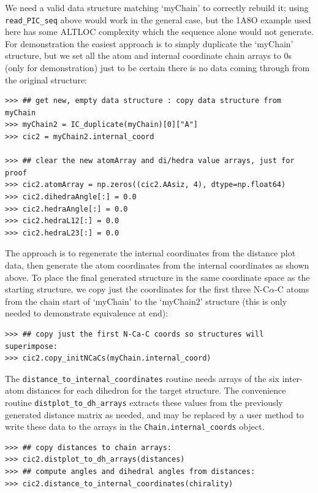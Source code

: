 We need a valid data structure matching `myChain' to correctly rebuild it; using
\texttt{read\_PIC\_seq\(\)} above would work in the general case, but the 1A8O example
used here has some ALTLOC complexity which the sequence alone would not generate.
For demonstration the easiest approach is to simply duplicate the `myChain'
structure, but we set all the atom and internal coordinate chain arrays to 0s
(only for demonstration) just to be certain there is no data coming through from the
original structure:

\begin{verbatim}
>>> ## get new, empty data structure : copy data structure from myChain
>>> myChain2 = IC_duplicate(myChain)[0]["A"]
>>> cic2 = myChain2.internal_coord

>>> ## clear the new atomArray and di/hedra value arrays, just for proof
>>> cic2.atomArray = np.zeros((cic2.AAsiz, 4), dtype=np.float64)
>>> cic2.dihedraAngle[:] = 0.0
>>> cic2.hedraAngle[:] = 0.0
>>> cic2.hedraL12[:] = 0.0
>>> cic2.hedraL23[:] = 0.0
\end{verbatim}

The approach is to regenerate the internal coordinates from the distance plot
data, then generate the atom coordinates from the internal coordinates as shown
above.  To place the final generated structure in the same coordinate space as the
starting structure, we copy just the coordinates for the first three N-C$\alpha$-C
atoms from the chain start of `myChain' to the `myChain2' structure (this is only needed
to demonstrate equivalence at end):

\begin{verbatim}
>>> ## copy just the first N-Ca-C coords so structures will superimpose:
>>> cic2.copy_initNCaCs(myChain.internal_coord)
\end{verbatim}

The \texttt{distance\_to\_internal\_coordinates\(\)} routine needs arrays of the six
inter-atom distances for each dihedron for the target structure.  The convenience
routine \texttt{distplot\_to\_dh\_arrays\(\)} extracts these values from the previously
generated distance matrix as needed, and may be replaced by a user method to
write these data to the arrays in the \texttt{Chain.internal\_coords} object.

\begin{verbatim}
>>> ## copy distances to chain arrays:
>>> cic2.distplot_to_dh_arrays(distances)
>>> ## compute angles and dihedral angles from distances:
>>> cic2.distance_to_internal_coordinates(chirality)
\end{verbatim}

